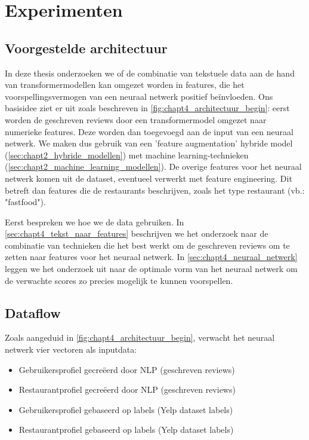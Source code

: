 \chapter{Experimenten}

\section{Voorgestelde architectuur}
In deze thesis onderzoeken we of de combinatie van tekstuele data aan de hand van transformermodellen kan omgezet worden in features, die het voorspellingsvermogen van een neuraal netwerk positief beïnvloeden. Ons basisidee ziet er uit zoals beschreven in \autoref{fig:chapt4_architectuur_begin}: eerst worden de geschreven reviews door een transformermodel omgezet naar numerieke features. Deze worden dan toegevoegd aan de input van een neuraal netwerk. We maken dus gebruik van een 'feature augmentation'  hybride model (\ref{sec:chapt2_hybride_modellen}) met machine learning-technieken (\ref{sec:chapt2_machine_learning_modellen}). De overige features voor het neuraal netwerk komen uit de dataset, eventueel verwerkt met feature engineering. Dit betreft dan features die de restaurants beschrijven, zoals het type restaurant (vb.: "fastfood").


Eerst bespreken we hoe we de data gebruiken. In \autoref{sec:chapt4_tekst_naar_features} beschrijven we het onderzoek naar de combinatie van technieken die het best werkt om de geschreven reviews om te zetten naar features voor het neuraal netwerk. In \autoref{sec:chapt4_neuraal_netwerk} leggen we het onderzoek uit naar de optimale vorm van het neuraal netwerk om de verwachte scores zo precies mogelijk te kunnen voorspellen.

\section{Dataflow} %
\label{sec:chapt4_data_flow}
Zoals aangeduid in \autoref{fig:chapt4_architectuur_begin}, verwacht het neuraal netwerk vier vectoren als inputdata:
\begin{itemize}
    \item Gebruikersprofiel gecreëerd door NLP (geschreven reviews)
    \item Restaurantprofiel gecreëerd door NLP (geschreven reviews)
    \item Gebruikersprofiel gebaseerd op labels (Yelp dataset labels)
    \item Restaurantprofiel gebaseerd op labels (Yelp dataset labels)
\end{itemize}

